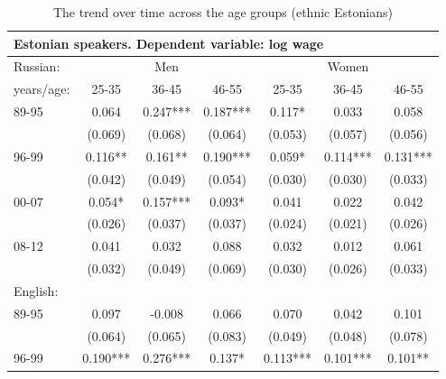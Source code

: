 \documentclass[12pt, a4paper]{article}
\def\tenpc{$^{\ast}$}
\def\fivepc{$^{\ast\ast}$}
\def\onepc{$^{\ast\ast\ast}$}
\newcommand{\legend}{\normalsize{Significance levels:\hspace{1em} \tenpc : 10\% \hspace{1em} \fivepc : 5\% \hspace{1em} \onepc : 1\% \normalsize}}
\providecommand{\DIFaddbegin}{} %
\providecommand{\DIFdelend}{} %
\newcommand{\DIFaddincludegraphics}[2][]{{\color{blue}\fbox{\DIFOincludegraphics[#1]{#2}}}} %
\DeclareRobustCommand{\DIFaddbegin}{\DIFOaddbegin \let\includegraphics\DIFaddincludegraphics} %
\DeclareRobustCommand{\DIFdelend}{\DIFOaddend \let\includegraphics\DIFOincludegraphics} %
\begin{document}
\DIFdelend \DIFaddbegin \begin{table}[htbp]
	\centering
	\caption{The trend over time across the age groups (ethnic Estonians)}
	\begin{tabular}{lccc|cc c}
     \toprule
		\multicolumn{7}{l}{Estonian speakers. Dependent variable: log wage}     \\ \hline
		Russian:  &  \multicolumn{3}{c|}{Men}  &  \multicolumn{3}{c}{Women}  \\
		years/age: & 25-35  & 36-45  & 46-55  & 25-35  & 36-45  & 46-55  \\ \midrule
		89-95   & 0.064  & 0.247*** & 0.187*** & 0.117*  & 0.033  & 0.058  \\
		      & (0.069) & (0.068) & (0.064) & (0.053) & (0.057) & (0.056) \\
		96-99   & 0.116** & 0.161** & 0.190*** & 0.059*  & 0.114*** & 0.131*** \\
		      & (0.042) & (0.049) & (0.054) & (0.030) & (0.030) & (0.033) \\
		00-07   & 0.054*  & 0.157*** & 0.093*  & 0.041  & 0.022  & 0.042  \\
		      & (0.026) & (0.037) & (0.037) & (0.024) & (0.021) & (0.026) \\
		08-12   & 0.041  & 0.032  & 0.088  & 0.032  & 0.012  & 0.061  \\
		      & (0.032) & (0.049) & (0.069) & (0.030) & (0.026) & (0.033) \\ \hline
		English:  &     &     &     &     &     &     \\
		89-95   & 0.097  & -0.008  & 0.066  & 0.070  & 0.042  & 0.101  \\
		      & (0.064) & (0.065) & (0.083) & (0.049) & (0.048) & (0.078) \\
		96-99   & 0.190*** & 0.276*** & 0.137*  & 0.113*** & 0.101*** & 0.101** \\

\end{tabular}
\end{table}
\end{document}
